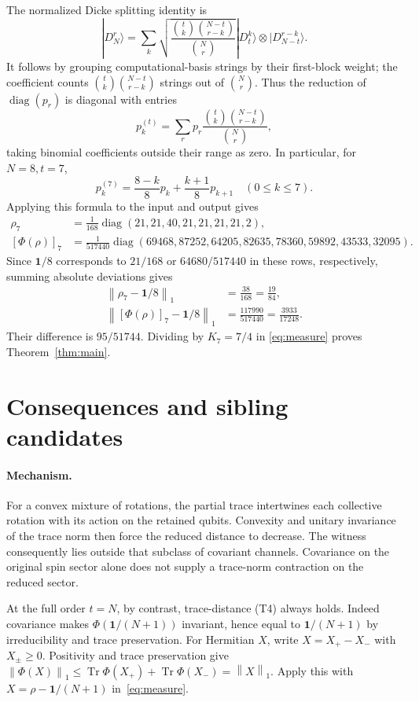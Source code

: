 \documentclass[11pt]{article}
\newcommand{\Tr}{\operatorname{Tr}}
\newcommand{\id}{\mathbf{1}}
\newcommand{\normone}[1]{\left\lVert #1\right\rVert_1}
\begin{document}
The normalized Dicke splitting identity is
\[
 |D_N^r\rangle=\sum_k
 \sqrt{\frac{\binom tk\binom{N-t}{r-k}}{\binom Nr}}
 |D_t^k\rangle\otimes|D_{N-t}^{r-k}\rangle.
\]
It follows by grouping computational-basis strings by their first-block
weight; the coefficient counts $\binom tk\binom{N-t}{r-k}$ strings out of
$\binom Nr$. Thus the reduction of $\operatorname{diag}(p_r)$ is diagonal with
entries
\[
 p^{(t)}_k=\sum_r p_r\frac{\binom tk\binom{N-t}{r-k}}{\binom Nr},
\]
taking binomial coefficients outside their range as zero. In particular,
for $N=8,t=7$,
\begin{equation}\label{eq:reduction}
 p^{(7)}_k=\frac{8-k}{8}p_k+\frac{k+1}{8}p_{k+1}\quad(0\leq k\leq7).
\end{equation}
Applying this formula to the input and output gives
\begin{align}\label{eq:marginals}
 \rho_7&=\frac1{168}\operatorname{diag}(21,21,40,21,21,21,21,2),\nonumber\\
 [\Phi(\rho)]_7&=\frac1{517440}\operatorname{diag}
 (69468,87252,64205,82635,78360,59892,43533,32095).
\end{align}
Since $\id/8$ corresponds to $21/168$ or $64680/517440$ in these rows,
respectively, summing absolute deviations gives
\begin{align*}
 \normone{\rho_7-\id/8}&=\frac{38}{168}=\frac{19}{84},\\
 \normone{[\Phi(\rho)]_7-\id/8}
 &=\frac{117990}{517440}=\frac{3933}{17248}.
\end{align*}
Their difference is $95/51744$. Dividing by $K_7=7/4$ in
\eqref{eq:measure} proves Theorem~\ref{thm:main}.

\section{Consequences and sibling candidates}
\paragraph{Mechanism.}
For a convex mixture of rotations, the partial trace intertwines each
collective rotation with its action on the retained qubits. Convexity and
unitary invariance of the trace norm then force the reduced distance to
decrease. The witness consequently lies outside that subclass of covariant
channels. Covariance on the original spin sector alone does not supply a
trace-norm contraction on the reduced sector.

At the full order $t=N$, by contrast, trace-distance (T4) always holds.
Indeed covariance makes $\Phi(\id/(N+1))$ invariant, hence equal to
$\id/(N+1)$ by irreducibility and trace preservation. For Hermitian $X$,
write $X=X_+-X_-$ with $X_\pm\geq0$. Positivity and trace preservation give
$\normone{\Phi(X)}\leq\Tr\Phi(X_+)+\Tr\Phi(X_-)=\normone{X}$.
Apply this with $X=\rho-\id/(N+1)$ in~\eqref{eq:measure}.
\end{document}
